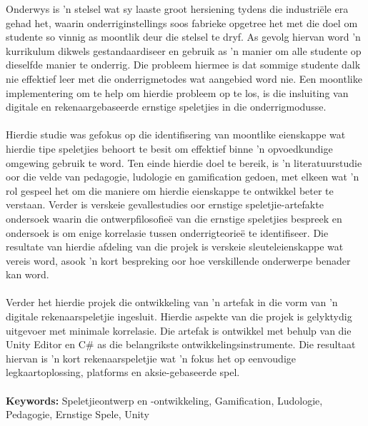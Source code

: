 \documentclass[
12pt, %
oneside, %
english, %
onehalfspacing, %
headsepline, %
]{MastersDoctoralThesis} %
\begin{document}
\begin{extraAbstract}
\addchaptertocentry{\abstractnameExtra} %
Onderwys is 'n stelsel wat sy laaste groot hersiening tydens die industriële era gehad het, waarin onderriginstellings soos fabrieke opgetree het met die doel om studente so vinnig as moontlik deur die stelsel te dryf. As gevolg hiervan word 'n kurrikulum dikwels gestandaardiseer en gebruik as 'n manier om alle studente op dieselfde manier te onderrig. Die probleem hiermee is dat sommige studente dalk nie effektief leer met die onderrigmetodes wat aangebied word nie. Een moontlike implementering om te help om hierdie probleem op te los, is die insluiting van digitale en rekenaargebaseerde ernstige speletjies in die onderrigmodusse.
\\\\
Hierdie studie was gefokus op die identifisering van moontlike eienskappe wat hierdie tipe speletjies behoort te besit om effektief binne 'n opvoedkundige omgewing gebruik te word. Ten einde hierdie doel te bereik, is 'n literatuurstudie oor die velde van pedagogie, ludologie en gamification gedoen, met elkeen wat 'n rol gespeel het om die maniere om hierdie eienskappe te ontwikkel beter te verstaan. Verder is verskeie gevallestudies oor ernstige speletjie-artefakte ondersoek waarin die ontwerpfilosofieë van die ernstige speletjies bespreek en ondersoek is om enige korrelasie tussen onderrigteorieë te identifiseer. Die resultate van hierdie afdeling van die projek is verskeie sleuteleienskappe wat vereis word, asook 'n kort bespreking oor hoe verskillende onderwerpe benader kan word.
\\\\
Verder het hierdie projek die ontwikkeling van 'n artefak in die vorm van 'n digitale rekenaarspeletjie ingesluit. Hierdie aspekte van die projek is gelyktydig uitgevoer met minimale korrelasie. Die artefak is ontwikkel met behulp van die Unity Editor en C\# as die belangrikste ontwikkelingsinstrumente. Die resultaat hiervan is 'n kort rekenaarspeletjie wat 'n fokus het op eenvoudige legkaartoplossing, platforms en aksie-gebaseerde spel.
\\\\
\textbf{Keywords:} Speletjieontwerp en -ontwikkeling, Gamification, Ludologie, Pedagogie, Ernstige Spele, Unity 


\end{extraAbstract}



\end{document}
